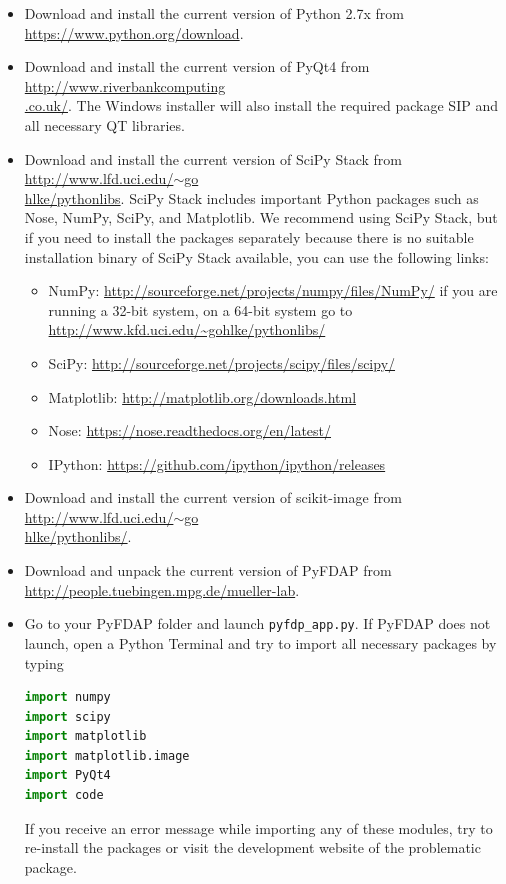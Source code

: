 \documentclass[a4paper,11pt]{article}
\begin{document}
\begin{itemize}
 \item Download and install the current version of Python 2.7x from \url{https://www.python.org/download}.
 \item Download and install the current version of PyQt4 from \href{http://www.riverbankcomputing.co.uk/software/pyqt/download}{http://www.riverbankcomputing\\.co.uk/}. The Windows installer will also install the required package SIP and all necessary QT libraries.
 \item Download and install the current version of SciPy Stack from \href{http://www.lfd.uci.edu/~gohlke/pythonlibs/#scipy-stack}{http://www.lfd.uci.edu/$\sim$go\\hlke/pythonlibs}. SciPy Stack includes important Python packages such as Nose, NumPy, SciPy, and Matplotlib. We recommend using SciPy Stack, but if you need to install the packages separately because there is no suitable installation binary of SciPy Stack available, you can use the following links: 
 \begin{itemize}
 \item NumPy: \url{http://sourceforge.net/projects/numpy/files/NumPy/} if you are running a 32-bit system, on a 64-bit system go to \url{http://www.kfd.uci.edu/~gohlke/pythonlibs/}
 \item SciPy: \url{http://sourceforge.net/projects/scipy/files/scipy/}
 \item Matplotlib: \url{http://matplotlib.org/downloads.html}
 \item Nose: \url{https://nose.readthedocs.org/en/latest/}
 \item IPython: \url{https://github.com/ipython/ipython/releases}
 \end{itemize}
 
\item  Download and install the current version of scikit-image from \href{http://www.lfd.uci.edu/~gohlke/pythonlibs/#scikit-image}{http://www.lfd.uci.edu/$\sim$go\\hlke/pythonlibs/}.
\item  Download and unpack the current version of PyFDAP from \url{http://people.tuebingen.mpg.de/mueller-lab}.%
\item Go to your PyFDAP folder and launch \verb+pyfdp_app.py+. If PyFDAP does not launch, open a Python Terminal and try to import all necessary packages by typing
\begin{lstlisting}[frame=single,language=Python]  
import numpy
import scipy
import matplotlib
import matplotlib.image
import PyQt4
import code
\end{lstlisting}

If you receive an error message while importing any of these modules, try to re-install the packages or visit the development website of the problematic package.

\end{itemize}
\end{document}
